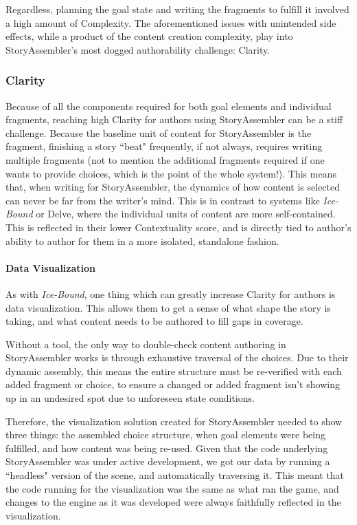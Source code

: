 
Regardless, planning the goal state and writing the fragments to fulfill it involved a high amount of Complexity. The aforementioned issues with unintended side effects, while a product of the content creation complexity, play into StoryAssembler's most dogged authorability challenge: Clarity.

\subsubsection{Clarity}
\label{clarity}

Because of all the components required for both goal elements and individual fragments, reaching high Clarity for authors using StoryAssembler can be a stiff challenge. Because the baseline unit of content for StoryAssembler is the fragment, finishing a story ``beat" frequently, if not always, requires writing multiple fragments (not to mention the additional fragments required if one wants to provide choices, which is the point of the whole system!). This means that, when writing for StoryAssembler, the dynamics of how content is selected can never be far from the writer's mind. This is in contrast to systems like \textit{Ice-Bound} or Delve, where the individual units of content are more self-contained. This is reflected in their lower Contextuality score, and is directly tied to author's ability to author for them in a more isolated, standalone fashion.

\paragraph{Data Visualization}

As with \textit{Ice-Bound}, one thing which can greatly increase Clarity for authors is data visualization. This allows them to get a sense of what shape the story is taking, and what content needs to be authored to fill gaps in coverage.

Without a tool, the only way to double-check content authoring in StoryAssembler works is through exhaustive traversal of the choices. Due to their dynamic assembly, this means the entire structure must be re-verified with each added fragment or choice, to ensure a changed or added fragment isn't showing up in an undesired spot due to unforeseen state conditions.

Therefore, the visualization solution created for StoryAssembler needed to show three things: the assembled choice structure, when goal elements were being fulfilled, and how content was being re-used. Given that the code underlying StoryAssembler was under active development, we got our data by running a ``headless" version of the scene, and automatically traversing it. This meant that the code running for the visualization was the same as what ran the game, and changes to the engine as it was developed were always faithfully reflected in the visualization. 

